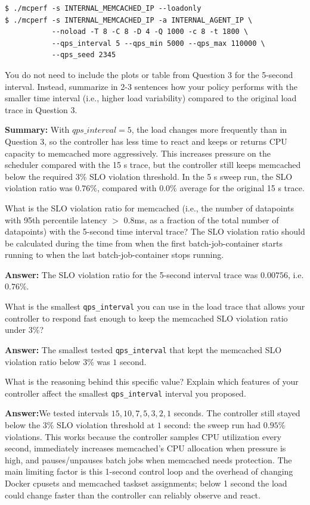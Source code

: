 \begin{enumerate}
\begin{Verbatim}[fontsize=\small]
$ ./mcperf -s INTERNAL_MEMCACHED_IP --loadonly 
$ ./mcperf -s INTERNAL_MEMCACHED_IP -a INTERNAL_AGENT_IP \ 
           --noload -T 8 -C 8 -D 4 -Q 1000 -c 8 -t 1800 \ 
           --qps_interval 5 --qps_min 5000 --qps_max 110000 \ 
           --qps_seed 2345
\end{Verbatim}
    
    You do not need to include the plots or table from Question 3 for the 5-second interval. Instead, summarize in 2-3 sentences how your policy performs with the smaller time interval (i.e., higher load variability) compared to the original load trace in Question 3. 

    \textbf{Summary:} 
    With $qps\_interval=5$, the load changes more frequently than in Question 3, so the controller has less time to react and keeps or returns CPU capacity to memcached more aggressively. This increases pressure on the scheduler compared with the 15 s trace, but the controller still keeps memcached below the required 3\% SLO violation threshold. In the 5 s sweep run, the SLO violation ratio was $0.76\%$, compared with $0.0\%$ average for the original 15 s trace.

    What is the SLO violation ratio for memcached (i.e., the number of datapoints with 95th percentile latency $>$ 0.8ms, as a fraction of the total number of datapoints) with the 5-second time interval trace? The SLO violation ratio should be calculated during the time from when the first batch-job-container starts running to when the last batch-job-container stops running.

    \textbf{Answer:} The SLO violation ratio for the 5-second interval trace was $0.00756$, i.e. $0.76\%$.

    What is the smallest \texttt{qps\_interval} you can use in the load trace that allows your controller to respond fast enough to keep the memcached SLO violation ratio under 3\%? 
    
    \textbf{Answer:} The smallest tested \texttt{qps\_interval} that kept the memcached SLO violation ratio below $3\%$ was $1$ second.

    What is the reasoning behind this specific value? Explain which features of your controller affect the smallest \texttt{qps\_interval} interval you proposed.

    \textbf{Answer:}We tested intervals $15,10,7,5,3,2,1$ seconds. The controller still stayed below the $3\%$ SLO violation threshold at $1$ second: the sweep run had $0.95\%$ violations. This works because the controller samples CPU utilization every second, immediately increases memcached's CPU allocation when pressure is high, and pauses/unpauses batch jobs when memcached needs protection. The main limiting factor is this 1-second control loop and the overhead of changing Docker cpusets and memcached taskset assignments; below 1 second the load could change faster than the controller can reliably observe and react.


\end{enumerate}

